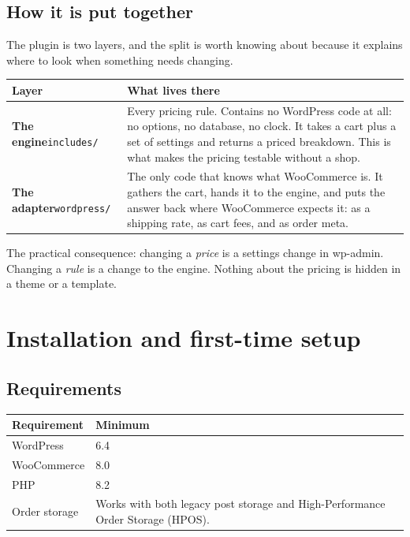 \documentclass[11pt,a4paper,oneside]{report}
\newcommand{\opt}[1]{\texttt{\small #1}}
\begin{document}
\section{How it is put together}

The plugin is two layers, and the split is worth knowing about because it explains
where to look when something needs changing.

\begin{longtable}{@{}L{4.2cm}L{10.6cm}@{}}
\toprule
\textbf{Layer} & \textbf{What lives there}\\
\midrule
\endhead
\textbf{The engine}\newline \opt{includes/} &
Every pricing rule. Contains no WordPress code at all: no options, no database, no
clock. It takes a cart plus a set of settings and returns a priced breakdown. This is
what makes the pricing testable without a shop.\\
\addlinespace
\textbf{The adapter}\newline \opt{wordpress/} &
The only code that knows what WooCommerce is. It gathers the cart, hands it to the
engine, and puts the answer back where WooCommerce expects it: as a shipping rate,
as cart fees, and as order meta.\\
\bottomrule
\end{longtable}

\begin{houseinfo}
The practical consequence: changing a \emph{price} is a settings change in wp-admin.
Changing a \emph{rule} is a change to the engine. Nothing about the pricing is hidden
in a theme or a template.
\end{houseinfo}

\chapter{Installation and first-time setup}

\section{Requirements}

\begin{longtable}{@{}L{4.5cm}L{10.3cm}@{}}
\toprule
\textbf{Requirement} & \textbf{Minimum}\\
\midrule
\endhead
WordPress & 6.4\\
WooCommerce & 8.0\\
PHP & 8.2\\
Order storage & Works with both legacy post storage and High-Performance Order Storage (HPOS).\\
\bottomrule
\end{longtable}
\end{document}
